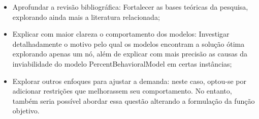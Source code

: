 \begin{itemize}
    \item Aprofundar a revisão bibliográfica: Fortalecer as bases teóricas da pesquisa, explorando ainda mais a literatura relacionada;
    \item Explicar com maior clareza o comportamento dos modelos: Investigar detalhadamente o motivo pelo qual os modelos encontram a solução ótima explorando apenas um nó, além de explicar com mais precisão as causas da inviabilidade do modelo PercentBehavioralModel em certas instâncias;
    \item Explorar outros enfoques para ajustar a demanda: neste caso, optou-se por adicionar restrições que melhorassem seu comportamento. No entanto, também seria possível abordar essa questão alterando a formulação da função objetivo.
\end{itemize}



